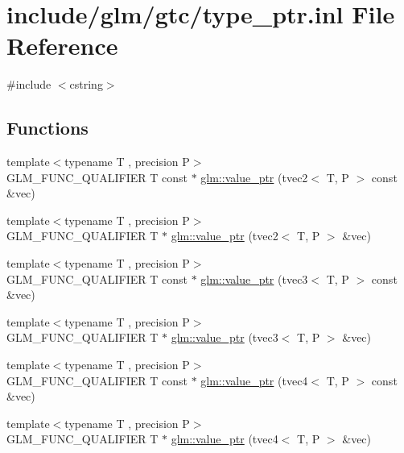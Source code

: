\hypertarget{type__ptr_8inl}{}\section{include/glm/gtc/type\+\_\+ptr.inl File Reference}
\label{type__ptr_8inl}
{\ttfamily \#include $<$cstring$>$}\newline
\subsection*{Functions}
\begin{DoxyCompactItemize}
\item 
{\footnotesize template$<$typename T , precision P$>$ }\\G\+L\+M\+\_\+\+F\+U\+N\+C\+\_\+\+Q\+U\+A\+L\+I\+F\+I\+ER T const  $\ast$ \hyperlink{group__gtc__type__ptr_gafb01331238d8899dde700cb9b5dc6ef3}{glm\+::value\+\_\+ptr} (tvec2$<$ T, P $>$ const \&vec)
\item 
{\footnotesize template$<$typename T , precision P$>$ }\\G\+L\+M\+\_\+\+F\+U\+N\+C\+\_\+\+Q\+U\+A\+L\+I\+F\+I\+ER T $\ast$ \hyperlink{group__gtc__type__ptr_gabd3cc713184a2093862605f5f0abb8a4}{glm\+::value\+\_\+ptr} (tvec2$<$ T, P $>$ \&vec)
\item 
{\footnotesize template$<$typename T , precision P$>$ }\\G\+L\+M\+\_\+\+F\+U\+N\+C\+\_\+\+Q\+U\+A\+L\+I\+F\+I\+ER T const  $\ast$ \hyperlink{group__gtc__type__ptr_gac04db5d9c05bd3d50140f34f8695a08c}{glm\+::value\+\_\+ptr} (tvec3$<$ T, P $>$ const \&vec)
\item 
{\footnotesize template$<$typename T , precision P$>$ }\\G\+L\+M\+\_\+\+F\+U\+N\+C\+\_\+\+Q\+U\+A\+L\+I\+F\+I\+ER T $\ast$ \hyperlink{group__gtc__type__ptr_gab2832ef9f1d2571fab5c7ae661e11e75}{glm\+::value\+\_\+ptr} (tvec3$<$ T, P $>$ \&vec)
\item 
{\footnotesize template$<$typename T , precision P$>$ }\\G\+L\+M\+\_\+\+F\+U\+N\+C\+\_\+\+Q\+U\+A\+L\+I\+F\+I\+ER T const  $\ast$ \hyperlink{group__gtc__type__ptr_gaf641bc0e28d4b274826b9afed315d310}{glm\+::value\+\_\+ptr} (tvec4$<$ T, P $>$ const \&vec)
\item 
{\footnotesize template$<$typename T , precision P$>$ }\\G\+L\+M\+\_\+\+F\+U\+N\+C\+\_\+\+Q\+U\+A\+L\+I\+F\+I\+ER T $\ast$ \hyperlink{group__gtc__type__ptr_ga4c19763f3c5991b9dc88a3ffdd9ea6cd}{glm\+::value\+\_\+ptr} (tvec4$<$ T, P $>$ \&vec)

\end{DoxyCompactItemize}
